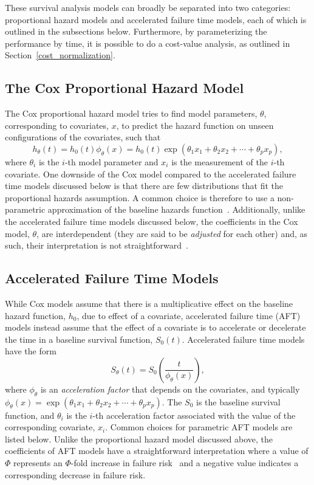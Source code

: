 These survival analysis models can broadly be separated into two categories: proportional hazard models and accelerated failure time models, each of which is outlined in the subsections below. Furthermore, by parameterizing the performance by time, it is possible to do a cost-value analysis, as outlined in Section~\ref{cost_normalization}.


\subsection{The Cox Proportional Hazard Model}
The Cox proportional hazard model tries to find model parameters, $\theta$, corresponding to covariates, $x$, to predict the hazard function on unseen configurations of the covariates, such that
\[
    h_\theta(t) = h_0(t)\phi_\theta(x) = h_0(t) \exp(\theta_1 x_1 + \theta_2 x_2 + \cdots + \theta_p x_p),
\]
where $\theta_i$ is the $i$-th model parameter and $x_i$ is the measurement of the $i$-th covariate. One downside of the Cox model compared to the accelerated failure time models discussed below is that there are few distributions that fit the proportional hazards assumption. A common choice is therefore to use a non-parametric approximation of the baseline hazards function~\cite{collett2023modelling}.
Additionally, unlike the accelerated failure time models discussed below, the coefficients in the Cox model, $\theta$, are interdependent (they are said to be \textit{adjusted} for each other) and, as such, their interpretation is not straightforward~\cite{collett2023modelling}.

\subsection{Accelerated Failure Time Models}
While Cox models assume that there is a multiplicative effect on the baseline hazard function, $h_0$, due to effect of a covariate, accelerated failure time (AFT) models instead assume that the effect of a covariate is to accelerate or decelerate the time in a baseline survival function, $S_0(t)$.
Accelerated failure time models have the form
\begin{equation} \label{eq:def_aft_model}
	S_\theta(t) = S_0 \left( \frac{t}{\phi_\theta(x)} \right),
\end{equation}
where $\phi_\theta$ is an \textit{acceleration factor} that depends on the covariates, and typically $\phi_\theta(x) =  \exp(\theta_1 x_1 + \theta_2 x_2 + \cdots + \theta_p x_p)$. The $S_0$  is the baseline survival function, and $\theta_i$ is the $i$-th acceleration factor associated with the value of the corresponding covariate, $x_i$. Common choices for parametric AFT models are listed below. Unlike the proportional hazard model discussed above, the coefficients of AFT models have a straightforward interpretation where a value of $\Phi$ represents an $\Phi$-fold increase in failure risk~\cite{collett2023modelling} and a negative value indicates a corresponding decrease in failure risk.


